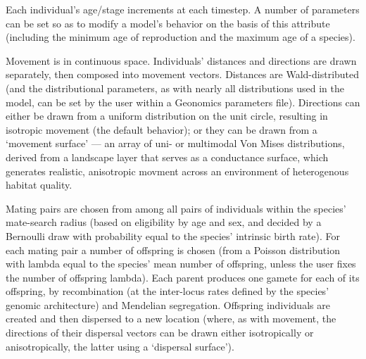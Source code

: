 ﻿\documentclass{article}
\begin{document}
Each individual's age/stage increments at each timestep.
A number of parameters can be set so as to modify a model's behavior on the basis of this attribute
(including the minimum age of reproduction and the maximum age of a species).

Movement is in continuous space. 
Individuals' distances and directions are drawn separately, then composed into movement vectors.
Distances are Wald-distributed (and the distributional parameters, as with nearly all distributions
used in the model, can be set by the user within a Geonomics parameters file).
Directions can either be drawn from a uniform distribution on the unit circle, resulting in isotropic movement
(the default behavior); or they can be drawn from a `movement surface' --- an array
of uni- or multimodal Von Mises distributions, derived from a landscape layer that serves as a conductance surface,
which generates realistic, anisotropic movment across an environment of heterogenous habitat quality.

Mating pairs are chosen from among all pairs of individuals within the species' mate-search radius
(based on eligibility by age and sex, and decided by a Bernoulli draw with probability equal to the species' intrinsic birth rate). 
For each mating pair a number of offspring is chosen (from a Poisson distribution with
lambda equal to the species' mean number of offspring, unless the user fixes the number of offspring lambda).
Each parent produces one gamete for each of its offspring, by recombination
(at the inter-locus rates defined by the species' genomic architecture) and Mendelian segregation.
Offspring individuals are created and then dispersed to a new location
(where, as with movement, the directions of their dispersal vectors can be drawn either isotropically or
anisotropically, the latter using a `dispersal surface').
\end{document}
